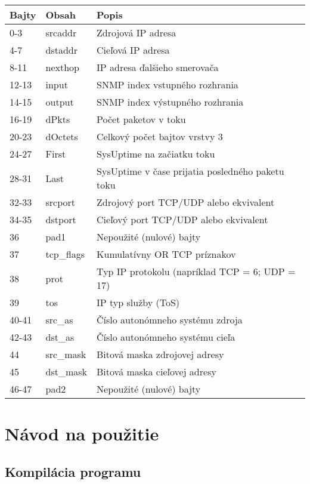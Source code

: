 \documentclass[a4paper, 12pt]{article}
\begin{document}
\begin{table}[h]
\centering
\begin{tabular}{|l|l|l|}
\hline
\textbf{Bajty} & \textbf{Obsah} & \textbf{Popis} \\
\hline
0-3 & srcaddr & Zdrojová IP adresa \\
4-7 & dstaddr & Cieľová IP adresa \\
8-11 & nexthop & IP adresa ďalšieho smerovača \\
12-13 & input & SNMP index vstupného rozhrania \\
14-15 & output & SNMP index výstupného rozhrania \\
16-19 & dPkts & Počet paketov v toku \\
20-23 & dOctets & Celkový počet bajtov vrstvy 3 \\
24-27 & First & SysUptime na začiatku toku \\
28-31 & Last & SysUptime v čase prijatia posledného paketu toku \\
32-33 & srcport & Zdrojový port TCP/UDP alebo ekvivalent \\
34-35 & dstport & Cieľový port TCP/UDP alebo ekvivalent \\
36 & pad1 & Nepoužité (nulové) bajty \\
37 & tcp\_flags & Kumulatívny OR TCP príznakov \\
38 & prot & Typ IP protokolu (napríklad TCP = 6; UDP = 17) \\
39 & tos & IP typ služby (ToS) \\
40-41 & src\_as & Číslo autonómneho systému zdroja \\
42-43 & dst\_as & Číslo autonómneho systému cieľa \\
44 & src\_mask & Bitová maska zdrojovej adresy \\
45 & dst\_mask & Bitová maska cieľovej adresy \\
46-47 & pad2 & Nepoužité (nulové) bajty \\
\hline
\end{tabular}
\end{table}


\newpage
\section{Návod na použitie}\label{sec:navod_na_pouzitie}

\subsection{Kompilácia programu}
\end{document}
